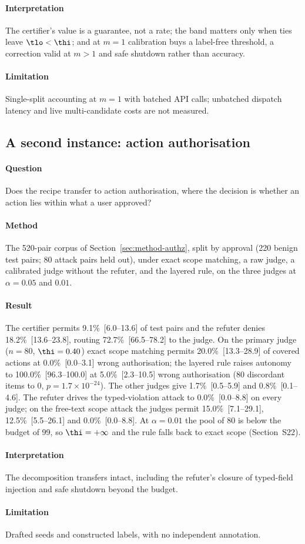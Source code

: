 \paragraph{Interpretation} The certifier's value is a guarantee, not a rate; the band matters only when ties leave $\tlo<\thi$; and at $m=1$ calibration buys a label-free threshold, a correction valid at $m>1$ and safe shutdown rather than accuracy.

\paragraph{Limitation} Single-split accounting at $m=1$ with batched API calls; unbatched dispatch latency and live multi-candidate costs are not measured.

\subsection{A second instance: action authorisation}\label{sec:res-authz}

\paragraph{Question} Does the recipe transfer to action authorisation, where the decision is whether an action lies within what a user approved?

\paragraph{Method} The 520-pair corpus of Section~\ref{sec:method-authz}, split by approval (220 benign test pairs; 80 attack pairs held out), under exact scope matching, a raw judge, a calibrated judge without the refuter, and the layered rule, on the three judges at $\alpha=0.05$ and $0.01$.

\paragraph{Result} The certifier permits 9.1\%~[6.0--13.6] of test pairs and the refuter denies 18.2\%~[13.6--23.8], routing 72.7\%~[66.5--78.2] to the judge. On the primary judge ($n=80$, $\thi=0.40$) exact scope matching permits 20.0\%~[13.3--28.9] of covered actions at 0.0\%~[0.0--3.1] wrong authorisation; the layered rule raises autonomy to 100.0\%~[96.3--100.0] at 5.0\%~[2.3--10.5] wrong authorisation (80 discordant items to 0, $p=1.7\times10^{-24}$). The other judges give 1.7\%~[0.5--5.9] and 0.8\%~[0.1--4.6]. The refuter drives the typed-violation attack to 0.0\%~[0.0--8.8] on every judge; on the free-text scope attack the judges permit 15.0\%~[7.1--29.1], 12.5\%~[5.5--26.1] and 0.0\%~[0.0--8.8]. At $\alpha=0.01$ the pool of 80 is below the budget of 99, so $\thi=+\infty$ and the rule falls back to exact scope (Section~S22).

\paragraph{Interpretation} The decomposition transfers intact, including the refuter's closure of typed-field injection and safe shutdown beyond the budget.

\paragraph{Limitation} Drafted seeds and constructed labels, with no independent annotation.
